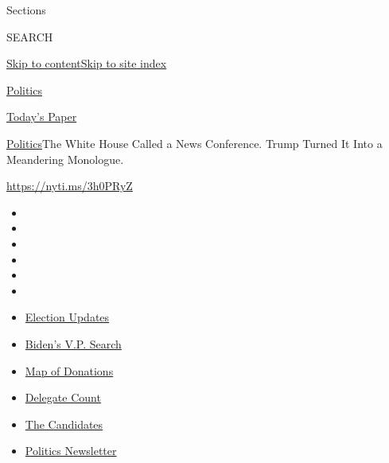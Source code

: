 Sections

SEARCH

\protect\hyperlink{site-content}{Skip to
content}\protect\hyperlink{site-index}{Skip to site index}

\href{https://www.nytimes.com/section/politics}{Politics}

\href{https://myaccount.nytimes.com/auth/login?response_type=cookie\&client_id=vi}{}

\href{https://www.nytimes.com/section/todayspaper}{Today's Paper}

\href{/section/politics}{Politics}\textbar{}The White House Called a
News Conference. Trump Turned It Into a Meandering Monologue.

\url{https://nyti.ms/3h0PRyZ}

\begin{itemize}
\item
\item
\item
\item
\item
\item
\end{itemize}

\begin{itemize}
\item
  \href{https://www.nytimes.com/2020/08/03/us/elections/biden-vs-trump.html?action=click\&pgtype=Article\&state=default\&region=TOP_BANNER\&context=storylines_menu}{Election
  Updates}
\item
  \href{https://www.nytimes.com/article/biden-vice-president-2020.html?action=click\&pgtype=Article\&state=default\&region=TOP_BANNER\&context=storylines_menu}{Biden's
  V.P. Search}
\item
  \href{https://www.nytimes.com/interactive/2020/07/24/us/politics/trump-biden-campaign-donors.html?action=click\&pgtype=Article\&state=default\&region=TOP_BANNER\&context=storylines_menu}{Map
  of Donations}
\item
  \href{https://www.nytimes.com/interactive/2020/us/elections/delegate-count-primary-results.html?action=click\&pgtype=Article\&state=default\&region=TOP_BANNER\&context=storylines_menu}{Delegate
  Count}
\item
  \href{https://www.nytimes.com/interactive/2019/us/politics/2020-presidential-candidates.html?action=click\&pgtype=Article\&state=default\&region=TOP_BANNER\&context=storylines_menu}{The
  Candidates}
\item
  \href{https://www.nytimes.com/newsletters/politics?action=click\&pgtype=Article\&state=default\&region=TOP_BANNER\&context=storylines_menu}{Politics
  Newsletter}
\end{itemize}

